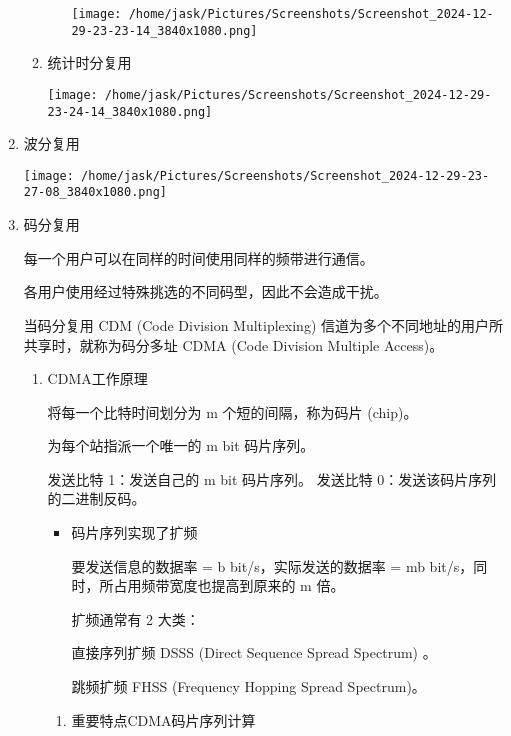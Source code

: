 \documentclass[11pt]{article}
\begin{document}
\begin{enumerate}
\begin{enumerate}
\begin{enumerate}
\begin{center}
\texttt{[image: /home/jask/Pictures/Screenshots/Screenshot\_2024-12-29-23-23-14\_3840x1080.png]}
\end{center}
\end{enumerate}
\item 统计时分复用
\label{sec:org412ac23}

\begin{center}
\texttt{[image: /home/jask/Pictures/Screenshots/Screenshot\_2024-12-29-23-24-14\_3840x1080.png]}
\end{center}
\end{enumerate}
\item 波分复用
\label{sec:orga8b4206}

\begin{center}
\texttt{[image: /home/jask/Pictures/Screenshots/Screenshot\_2024-12-29-23-27-08\_3840x1080.png]}
\end{center}
\item 码分复用
\label{sec:org0ad33fd}

每一个用户可以在同样的时间使用同样的频带进行通信。

各用户使用经过特殊挑选的不同码型，因此不会造成干扰。

当码分复用 CDM (Code Division Multiplexing) 信道为多个不同地址的用户所共享时，就称为码分多址 CDMA (Code Division Multiple Access)。
\begin{enumerate}
\item CDMA工作原理
\label{sec:orgecd83b5}

将每一个比特时间划分为 m 个短的间隔，称为码片 (chip)。

为每个站指派一个唯一的 m bit 码片序列。

发送比特 1：发送自己的 m bit 码片序列。
发送比特 0：发送该码片序列的二进制反码。

\begin{itemize}
\item 码片序列实现了扩频

要发送信息的数据率 = b bit/s，实际发送的数据率 = mb bit/s，同时，所占用频带宽度也提高到原来的 m 倍。

扩频通常有 2 大类：

直接序列扩频 DSSS (Direct Sequence Spread Spectrum) 。

跳频扩频 FHSS (Frequency Hopping Spread Spectrum)。
\end{itemize}
\begin{enumerate}
\item 重要特点\hfill{}\textsc{CDMA码片序列计算}
\label{sec:org4328fd3}


\end{enumerate}
\end{enumerate}
\end{enumerate}
\end{document}
